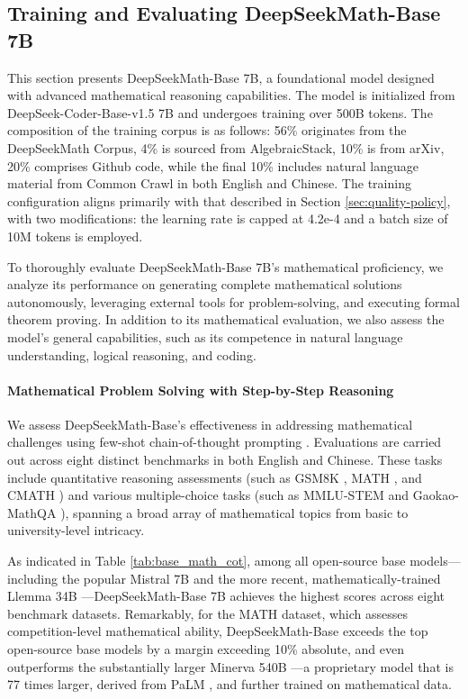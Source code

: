 \subsection{Training and Evaluating DeepSeekMath-Base 7B}

This section presents DeepSeekMath-Base 7B, a foundational model designed with advanced mathematical reasoning capabilities. The model is initialized from DeepSeek-Coder-Base-v1.5 7B \citep{deepseek-coder} and undergoes training over 500B tokens. The composition of the training corpus is as follows: 56\% originates from the DeepSeekMath Corpus, 4\% is sourced from AlgebraicStack, 10\% is from arXiv, 20\% comprises Github code, while the final 10\% includes natural language material from Common Crawl in both English and Chinese. The training configuration aligns primarily with that described in Section \ref{sec:quality-policy}, with two modifications: the learning rate is capped at 4.2e-4 and a batch size of 10M tokens is employed.

To thoroughly evaluate DeepSeekMath-Base 7B's mathematical proficiency, we analyze its performance on generating complete mathematical solutions autonomously, leveraging external tools for problem-solving, and executing formal theorem proving. In addition to its mathematical evaluation, we also assess the model’s general capabilities, such as its competence in natural language understanding, logical reasoning, and coding.

\paragraph{Mathematical Problem Solving with Step-by-Step Reasoning}

We assess DeepSeekMath-Base's effectiveness in addressing mathematical challenges using few-shot chain-of-thought prompting \citep{cot}. Evaluations are carried out across eight distinct benchmarks in both English and Chinese. These tasks include quantitative reasoning assessments (such as GSM8K \citep{gsm8k}, MATH \citep{MATH}, and CMATH \citep{wei2023cmath}) and various multiple-choice tasks (such as MMLU-STEM \citep{mmlu} and Gaokao-MathQA \citep{agieval}), spanning a broad array of mathematical topics from basic to university-level intricacy.

As indicated in Table \ref{tab:base_math_cot}, among all open-source base models—including the popular Mistral 7B \citep{mistral} and the more recent, mathematically-trained Llemma 34B \citep{llemma}—DeepSeekMath-Base 7B achieves the highest scores across eight benchmark datasets. Remarkably, for the MATH dataset, which assesses competition-level mathematical ability, DeepSeekMath-Base exceeds the top open-source base models by a margin exceeding 10\% absolute, and even outperforms the substantially larger Minerva 540B \citep{minerva}—a proprietary model that is 77 times larger, derived from PaLM \citep{palm}, and further trained on mathematical data.

